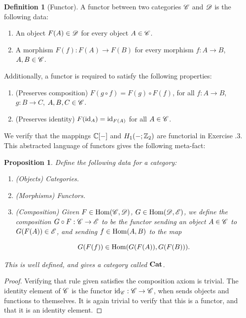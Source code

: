 \documentclass{article}
\newtheorem{proposition}{Proposition}[section]
\theoremstyle{definition}
\newtheorem*{definition}{Definition}
\numberwithin{figure}{section}
\begin{document}
\begin{definition}[Functor] A functor between two categories $\mathscr{C}$ and $\mathscr{D}$ is the following data:

\begin{enumerate}
\item An object $F(A)\in\mathscr{D}$ for every object $A\in \mathscr{C}$.
\item A morphism $F(f):F(A)\to F(B)$ for every morphism $f:A\to B$, $A,B\in \mathscr{C}$.
\end{enumerate}

Additionally, a functor is required to satisfy the following properties:

\begin{enumerate}
\item (Preserves composition) $F(g\circ f)=F(g)\circ F(f)$, for all $f:A\to B$, $g:B\to C$, $A,B,C\in \mathscr{C}$.
\item (Preserves identity) $F(\mathrm{id}_{A})=\mathrm{id}_{F(A)}$ for all $A\in \mathscr{C}$.
\end{enumerate}

\raggedleft\qedsymbol{}
\end{definition}

We verify that the mappings $\mathbb{C}[\--]$ and $H_1(\--;\mathbb{Z}_2)$ are functorial in Exercise \thesection.3. This abstracted language of functors gives the following meta-fact:

\begin{proposition} Define the following data for a category:

\begin{enumerate}
\item (Objects) Categories.
\item (Morphisms) Functors.
\item (Composition) Given $F\in \mathrm{Hom}(\mathscr{C},\mathscr{D})$, $G\in \mathrm{Hom}(\mathscr{D},\mathscr{E})$, we define the composition $G\circ F: \mathscr{C} \to \mathscr{E}$ to be the functor sending an object $A\in \mathscr{C}$ to $G(F(A))\in \mathscr{E}$, and sending $f\in \mathrm{Hom}(A,B)$ to the map

$$G(F(f))\in \mathrm{Hom}(G(F(A)),G(F(B))).$$ 
\end{enumerate}

This is well defined, and gives a category called $\bold{Cat}$.
\end{proposition}
\begin{proof} Verifying that rule given satisfies the composition axiom is trivial. The identity element of $\mathscr{C}$ is the functor $\mathrm{id}_{\mathscr{C}}:\mathscr{C}\to \mathscr{C}$, when sends objects and functions to themselves. It is again trivial to verify that this is a functor, and that it is an identity element.
\end{proof}
\end{document}
